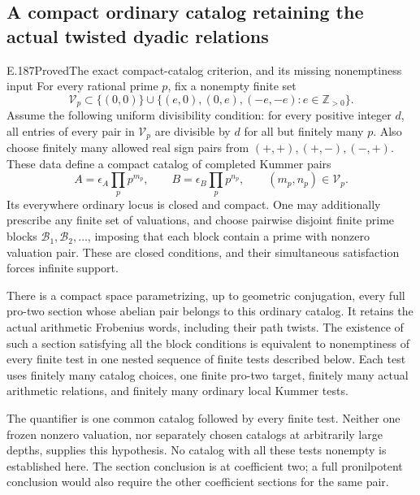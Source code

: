\subsection{A compact ordinary catalog retaining the actual twisted dyadic relations}

\begin{result}{E.187}{Proved}{The exact compact-catalog criterion, and its missing nonemptiness input}
For every rational prime \(p\), fix a nonempty finite set
\[
 \mathcal V_p\subset
 \{(0,0)\}\cup
 \{(e,0),(0,e),(-e,-e):e\in\mathbb Z_{>0}\}.
 \tag{E.187.1}
\]
Assume the following uniform divisibility condition:
for every positive integer \(d\), all entries of every pair
in \(\mathcal V_p\) are divisible by \(d\) for all but
finitely many \(p\). Also choose finitely many allowed real
sign pairs from \((+,+),(+,-),(-,+)\).
These data define a compact catalog of completed Kummer pairs
\[
 A=\epsilon_A\prod_p p^{m_p},\qquad
 B=\epsilon_B\prod_p p^{n_p},\qquad
                     (m_p,n_p)\in\mathcal V_p.
 \tag{E.187.2}
\]
Its everywhere ordinary locus is closed and compact.
One may additionally prescribe any finite set of valuations,
and choose pairwise disjoint finite prime blocks
\(\mathcal B_1,\mathcal B_2,\ldots\), imposing that each
block contain a prime with nonzero valuation pair. These
are closed conditions, and their simultaneous satisfaction
forces infinite support.

There is a compact space parametrizing, up to geometric
conjugation, every full pro-two section whose abelian pair
belongs to this ordinary catalog. It retains the actual
arithmetic Frobenius words, including their path twists.
The existence of such a section satisfying all the block
conditions is equivalent to nonemptiness of every finite
test in one nested sequence of finite tests described below.
Each test uses finitely many catalog choices, one finite
pro-two target, finitely many actual arithmetic relations,
and finitely many ordinary local Kummer tests.

The quantifier is one common catalog followed by every
finite test. Neither one frozen nonzero valuation, nor
separately chosen catalogs at arbitrarily large depths,
supplies this hypothesis. No catalog with all these tests
nonempty is established here. The section conclusion is
at coefficient two; a full pronilpotent conclusion would
also require the other coefficient sections for the same pair.
\end{result}

